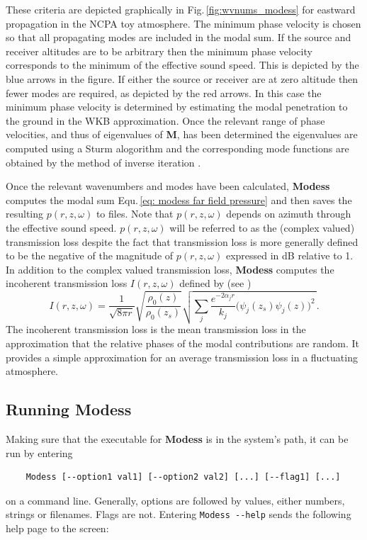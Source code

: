 These criteria are depicted graphically in Fig.\,\ref{fig:wvnums_modess} for eastward propagation in the NCPA toy atmosphere. The minimum phase velocity is chosen so that all propagating modes are included in the modal sum. If the source and receiver altitudes are to be arbitrary then the minimum phase velocity corresponds to the minimum of the effective sound speed. This is depicted by the blue arrows in the figure. If either the source or receiver are at zero altitude then fewer modes are required, as depicted by the red arrows. In this case the minimum phase velocity is determined by estimating the modal penetration to the ground in the WKB approximation. Once the relevant range of phase velocities, and thus of eigenvalues of \textbf{M}, has been determined the eigenvalues are computed using a Sturm alogorithm \cite{Stoer_Bulirsch} and the corresponding mode functions are obtained by the method of inverse iteration \cite{Press:2007:NRE:1403886}. 

Once the relevant wavenumbers and modes have been calculated, {\bf Modess} computes the modal sum Equ.\,\ref{eq: modess far field pressure} and then saves the resulting $p(r,z,\omega)$ to files. Note that $p(r,z,\omega)$ depends on azimuth through the effective sound speed. $p(r,z,\omega)$ will be referred to as the (complex valued) transmission loss despite the fact that transmission loss is more generally defined to be the negative of the magnitude of $p(r,z,\omega)$ expressed in dB relative to 1. In addition to the complex valued transmission loss, {\bf Modess} computes the incoherent transmission loss $I(r,z,\omega)$ defined by (see \cite{comp_oc_ac}) 
\[
I(r,z,\omega)
=
\frac{1}{\sqrt{8 \pi r}} \sqrt{\frac {\rho_0(z)} {\rho_0(z_s)}} \sqrt{\sum_j\frac{e^{-2\alpha_jr}}{k_j}\big(\psi_j(z_s)\psi_j(z)\big)^2\,} .
\]
The incoherent transmission loss is the mean transmission loss in the approximation that the relative phases of the modal contributions are random. It provides a simple approximation for an average transmission loss in a fluctuating atmosphere. 

\subsection{Running Modess}
\label{sec:running modess}

Making sure that the executable for {\bf Modess} is in the system's path, it can be run by entering 
\begin{verbatim} 
    Modess [--option1 val1] [--option2 val2] [...] [--flag1] [...] 
\end{verbatim}
on a command line. Generally, options are followed by values, either numbers, strings or filenames. Flags are not. Entering \verb"Modess --help" sends the following help page to the screen: 


